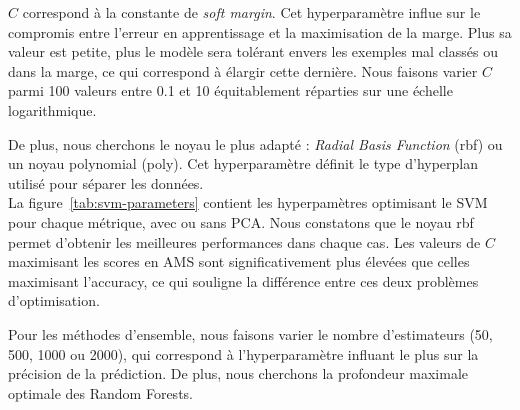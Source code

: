 \documentclass[12pt]{article}
\newcommand{\figref}[1]{figure~\ref{#1}}
\begin{document}
$C$ correspond à la constante de \emph{soft margin}. Cet hyperparamètre influe
sur le compromis entre l'erreur en apprentissage et la maximisation de la marge.
Plus sa valeur est petite, plus le modèle sera tolérant envers les exemples mal
classés ou dans la marge, ce qui correspond à élargir cette dernière. Nous
faisons varier $C$ parmi 100 valeurs entre 0.1 et 10 équitablement réparties sur
une échelle logarithmique.

De plus, nous cherchons le noyau le plus adapté : \emph{Radial Basis Function}
(rbf) ou un noyau polynomial (poly). Cet hyperparamètre définit le type
d'hyperplan utilisé pour séparer les données.  \\

La \figref{tab:svm-parameters} contient les hyperpamètres optimisant le SVM pour
chaque métrique, avec ou sans PCA. Nous constatons que le noyau rbf permet
d'obtenir les meilleures performances dans chaque cas. Les valeurs de $C$
maximisant les scores en AMS sont significativement plus élevées que celles
maximisant l'accuracy, ce qui souligne la différence entre ces deux problèmes
d'optimisation.\\


\begin{table}[H]
    \centering
    \caption{Paramètres optimaux pour le SVM}
    \label{tab:svm-parameters}
\end{table}

Pour les méthodes d'ensemble, nous faisons varier le nombre d'estimateurs (50,
500, 1000 ou 2000), qui correspond à l'hyperparamètre influant le plus sur la
précision de la prédiction. De plus, nous cherchons la profondeur maximale
optimale des Random Forests.  \\
\end{document}
